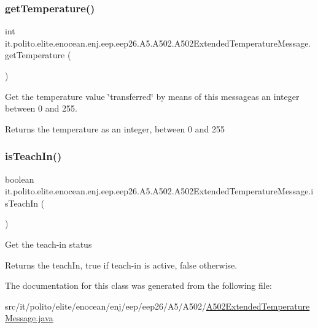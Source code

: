\subsubsection{\texorpdfstring{get\+Temperature()}{getTemperature()}}
{\footnotesize\ttfamily int it.\+polito.\+elite.\+enocean.\+enj.\+eep.\+eep26.\+A5.\+A502.\+A502\+Extended\+Temperature\+Message.\+get\+Temperature (\begin{DoxyParamCaption}{ }\end{DoxyParamCaption})}

Get the temperature value \char`\"{}transferred\char`\"{} by means of this messageas an integer between 0 and 255. \begin{DoxyReturn}{Returns}
the temperature as an integer, between 0 and 255 
\end{DoxyReturn}
\hypertarget{classit_1_1polito_1_1elite_1_1enocean_1_1enj_1_1eep_1_1eep26_1_1_a5_1_1_a502_1_1_a502_extended_temperature_message_a0f5ea72da30ca059d36ecba516683961}{}\label{classit_1_1polito_1_1elite_1_1enocean_1_1enj_1_1eep_1_1eep26_1_1_a5_1_1_a502_1_1_a502_extended_temperature_message_a0f5ea72da30ca059d36ecba516683961} 
\subsubsection{\texorpdfstring{is\+Teach\+In()}{isTeachIn()}}
{\footnotesize\ttfamily boolean it.\+polito.\+elite.\+enocean.\+enj.\+eep.\+eep26.\+A5.\+A502.\+A502\+Extended\+Temperature\+Message.\+is\+Teach\+In (\begin{DoxyParamCaption}{ }\end{DoxyParamCaption})}

Get the teach-\/in status \begin{DoxyReturn}{Returns}
the teach\+In, true if teach-\/in is active, false otherwise. 
\end{DoxyReturn}


The documentation for this class was generated from the following file\+:\begin{DoxyCompactItemize}
\item 
src/it/polito/elite/enocean/enj/eep/eep26/\+A5/\+A502/\hyperlink{_a502_extended_temperature_message_8java}{A502\+Extended\+Temperature\+Message.\+java}\end{DoxyCompactItemize}
